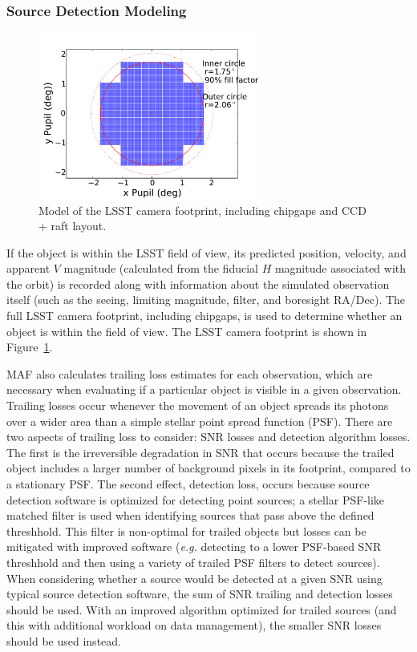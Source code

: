 \subsubsection{Source Detection Modeling} 


\begin{figure}[t!]
\centering
\includegraphics[width=0.65\textwidth]{figures/focalplane} 
\caption{Model of the LSST camera footprint, including chipgaps and CCD + raft layout. \label{fig:camera_footprint}}
\end{figure}

If the object is within the LSST field of view, its predicted position, velocity, and apparent $V$ magnitude (calculated from the fiducial $H$ magnitude associated with the orbit) is recorded along with information about the simulated observation itself (such as the seeing, limiting magnitude, filter, and boresight RA/Dec). The full LSST camera footprint, including chipgaps, is used to determine whether 
an object is within the field of view. The LSST camera footprint is shown in Figure~\ref{fig:camera_footprint}.

MAF also calculates trailing loss estimates for each observation, which are necessary when evaluating if a particular object is visible in a given observation. Trailing losses occur whenever the movement of an object spreads its photons over a wider area than a simple stellar point spread function (PSF). There are two aspects of trailing loss to consider: SNR losses and detection algorithm losses. The first is the
irreversible degradation in SNR that occurs because the trailed object includes a larger number of background pixels in its footprint, compared to a stationary PSF. The second effect, detection loss, occurs because source detection software is optimized for detecting point sources; a stellar PSF-like matched filter is used when identifying sources that pass above the defined threshhold. This filter is non-optimal for trailed objects but losses can be mitigated with improved software ({\it e.g.} detecting to a lower PSF-based SNR threshhold and then using a variety of trailed PSF filters to detect sources). When considering whether a source would be detected at a given SNR using typical source detection software, the sum of SNR trailing and detection losses should be used. With an improved
algorithm optimized for trailed sources (and this with additional workload on data management), the smaller SNR losses should be 
used instead.


